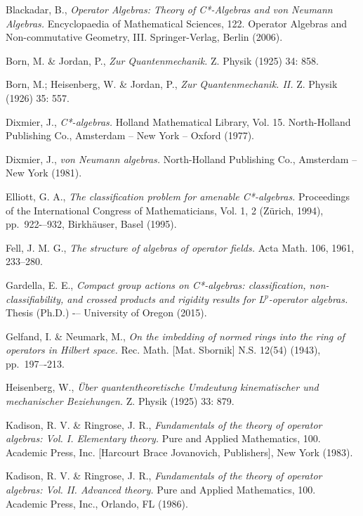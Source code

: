 \documentclass[12pt,a4paper]{amsart}
\theoremstyle{plain}
\theoremstyle{definition}
\begin{document}
\begin{thebibliography}{00}
	Blackadar, B.,
	\emph{Operator Algebras: Theory of C*-Algebras and von Neumann Algebras.}
	Encyclopaedia of Mathematical Sciences, 122. Operator Algebras and Non-commutative Geometry, III. Springer-Verlag, Berlin (2006).
	
	Born, M. \& Jordan, P.,
	\emph{Zur Quantenmechanik.}
	Z. Physik (1925) 34: 858.
	
	Born, M.; Heisenberg, W. \& Jordan, P.,
	\emph{Zur Quantenmechanik. II.}
	Z. Physik (1926) 35: 557.

	Dixmier, J.,
	\emph{C*-algebras.}
	Holland Mathematical Library, Vol. 15. North-Holland Publishing Co., Amsterdam -- New York -- Oxford (1977).

	Dixmier, J.,
	\emph{von Neumann algebras.}
	North-Holland Publishing Co., Amsterdam -- New York (1981).
		
	Elliott, G. A.,
	\emph{The classification problem for amenable C*-algebras.}
	Proceedings of the International Congress of Mathematicians, Vol. 1, 2 (Z\"{u}rich, 1994), pp.~922-–932, Birkhäuser, Basel (1995).

	Fell, J. M. G.,
	\emph{The structure of algebras of operator fields. }
	Acta Math. 106, 1961, 233–280. 


	Gardella, E. E.,
	\emph{Compact group actions on C*-algebras: classification, non-classifiability, and crossed products and rigidity results for L$^p$-operator algebras. }
	Thesis (Ph.D.) -– University of Oregon (2015).

	Gelfand, I. \& Neumark, M.,
	\emph{On the imbedding of normed rings into the ring of operators in Hilbert space.}
	Rec. Math. [Mat. Sbornik] N.S. 12(54) (1943), pp.~197–-213.

	Heisenberg, W.,
	\emph{{\"U}ber quantentheoretische Umdeutung kinematischer und mechanischer Beziehungen.}
	Z. Physik (1925) 33: 879. 
	
	Kadison, R. V. \& Ringrose, J. R.,
	\emph{Fundamentals of the theory of operator algebras: Vol. I. Elementary theory.}
	Pure and Applied Mathematics, 100. Academic Press, Inc. [Harcourt Brace Jovanovich, Publishers], New York (1983).

	Kadison, R. V. \& Ringrose, J. R.,
	\emph{Fundamentals of the theory of operator algebras: Vol. II. Advanced theory.}
	Pure and Applied Mathematics, 100. Academic Press, Inc., Orlando, FL (1986).
	

\end{thebibliography}
\end{document}
